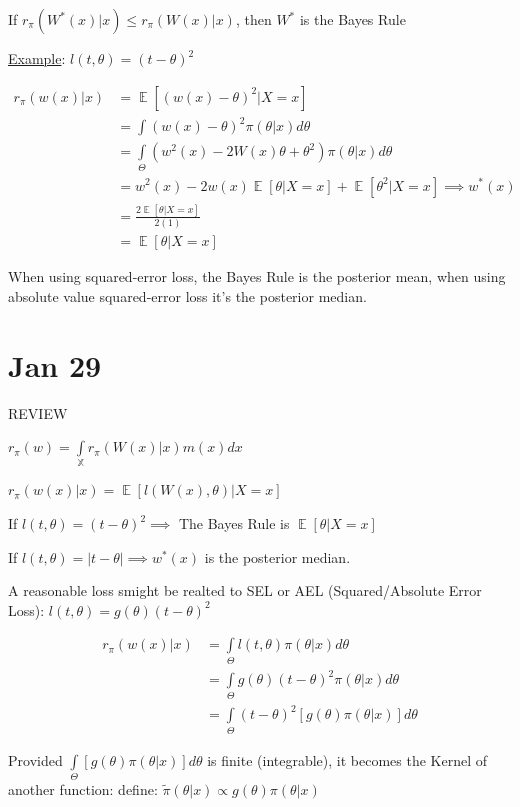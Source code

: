 \documentclass{article}
\DeclareMathOperator{\EX}{\mathbb{E}} %
\let\Oldint=\int
\renewcommand{\int}{\Oldint\limits}
\begin{document}
If $r_{\pi}(W^*(x)|x) \le r_{\pi}(W(x)|x)$, then $W^*$ is the Bayes Rule

\underline{Example}: $l(t, \theta) = (t-\theta)^2$

$$
\begin{aligned}
r_{\pi}(w(x) | x) 
&= \EX[(w(x) - \theta)^2 | X=x] \\
&= \int(w(x) - \theta)^2\pi(\theta|x)d\theta \\
&= \int_{\Theta}(w^2(x) - 2W(x)\theta + \theta^2)\pi(\theta|x)d\theta \\
&= w^2(x) - 2w(x)\EX[\theta|X=x] + \EX[\theta^2|X=x] \implies w^*(x) \\
&= \frac{2\EX[\theta|X=x]}{2(1)} \\
&= \EX[\theta|X=x]
\end{aligned}
$$

When using squared-error loss, the Bayes Rule is the posterior mean, when using absolute value squared-error loss it's the posterior median. 


\section{Jan 29}

REVIEW

$r_{\pi}(w) = \int_\mathbb{X} r_{\pi}(W(x)|x)m(x)dx$

$r_{\pi}(w(x) | x)  = \EX[l(W(x), \theta)|X=x]$

If $l(t, \theta) = (t-\theta)^2 \implies$ The Bayes Rule is $\EX[\theta|X=x]$

If $l(t, \theta) = |t-\theta| \implies w^*(x)$ is the posterior median. 


A reasonable loss smight be realted to SEL or AEL (Squared/Absolute Error Loss): $l(t, \theta) = g(\theta)(t-\theta)^2$

$$
\begin{aligned}
r_{\pi}(w(x) | x)  
&= \int_{\Theta} l(t, \theta)\pi(\theta|x)d\theta \\
&= \int_{\Theta} g(\theta)(t-\theta)^2\pi(\theta|x)d\theta \\
&= \int_{\Theta} (t-\theta)^2[g(\theta)\pi(\theta|x)]d\theta
\end{aligned}
$$

Provided $\int_{\Theta} [g(\theta)\pi(\theta|x)]d\theta$ is finite (integrable), it becomes the Kernel of another function: define: $\tilde{\pi}(\theta|x) \propto g(\theta)\pi(\theta|x)$
\end{document}
